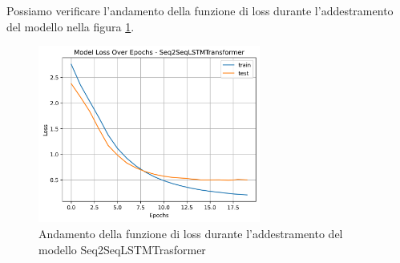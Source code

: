 Possiamo verificare l'andamento della funzione di loss durante l'addestramento del modello nella figura \ref{fig:seq2seqlstmtrasformer_loss}.
\begin{figure}[H]
    \centering
    \includegraphics[width=0.65\textwidth]{media/Seq2SeqLSTMTransformer_originale_lossplot.png}
    \caption{Andamento della funzione di loss durante l'addestramento del modello Seq2SeqLSTMTrasformer}
    \label{fig:seq2seqlstmtrasformer_loss}
\end{figure}
